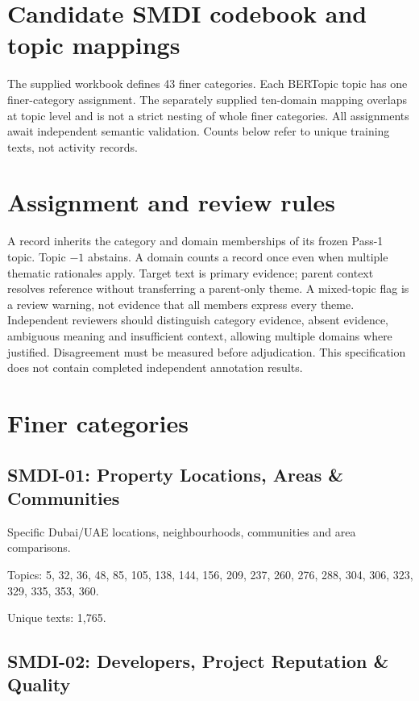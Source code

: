 \documentclass[10pt]{article}
\begin{document}
\section*{Candidate SMDI codebook and topic mappings}

The supplied workbook defines 43 finer categories. Each BERTopic topic has one finer-category assignment. The separately supplied ten-domain mapping overlaps at topic level and is not a strict nesting of whole finer categories. All assignments await independent semantic validation. Counts below refer to unique training texts, not activity records.

\section*{Assignment and review rules}

A record inherits the category and domain memberships of its frozen Pass-1 topic. Topic $-1$ abstains. A domain counts a record once even when multiple thematic rationales apply. Target text is primary evidence; parent context resolves reference without transferring a parent-only theme. A mixed-topic flag is a review warning, not evidence that all members express every theme. Independent reviewers should distinguish category evidence, absent evidence, ambiguous meaning and insufficient context, allowing multiple domains where justified. Disagreement must be measured before adjudication. This specification does not contain completed independent annotation results.

\section*{Finer categories}

\subsection*{SMDI-01: Property Locations, Areas \& Communities}

Specific Dubai/UAE locations, neighbourhoods, communities and area comparisons.

\par Topics: 5, 32, 36, 48, 85, 105, 138, 144, 156, 209, 237, 260, 276, 288, 304, 306, 323, 329, 335, 353, 360.

\par Unique texts: 1,765.

\subsection*{SMDI-02: Developers, Project Reputation \& Quality}
\end{document}
